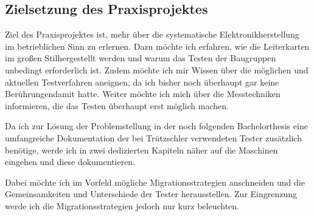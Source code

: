 \subsection{Zielsetzung des Praxisprojektes}
    Ziel des Praxisprojektes ist, mehr über die systematische Elektronikherstellung im betrieblichen Sinn zu erlernen.
    Dazu möchte ich erfahren, wie die Leiterkarten im \glqq großen Stil\grqq\@ hergestellt werden und warum das Testen der Baugruppen unbedingt erforderlich ist.
    Zudem möchte ich mir Wissen über die möglichen und aktuellen Testverfahren aneignen, da ich bisher noch überhaupt gar keine \glqq Berührungen\grqq\@ damit hatte.
    Weiter möchte ich mich über die Messtechniken informieren, die das Testen überhaupt erst möglich machen.

    Da ich zur Lösung der Problemstellung in der noch folgenden Bachelorthesis eine umfangreiche Dokumentation der bei Trützschler verwendeten Tester zusätzlich benötige, werde ich in zwei dedizierten Kapiteln näher auf die Maschinen eingehen und diese dokumentieren.

    Dabei möchte ich im Vorfeld mögliche Migrationsstrategien anschneiden und die Gemeinsamkeiten und Unterschiede der Tester herausstellen.
    Zur Eingrenzung werde ich die Migrationsstrategien jedoch nur kurz beleuchten.
    
